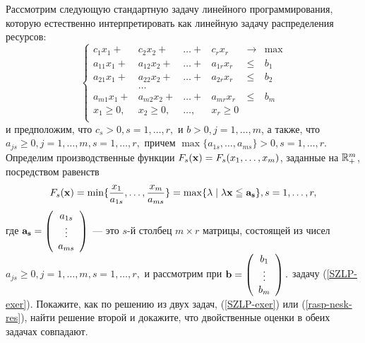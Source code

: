 \begin{exer}
    Рассмотрим следующую стандартную задачу линейного
    программирования, которую
    естественно интерпретировать  как линейную задачу распределения
    ресурсов:
\begin{equation} \label{SZLP-exer}
\left\{
\begin{array}{rrrrllll}
     c_1 x_1 + & c_2 x_2 +    & \ldots +& c_r x_r &\to & \max\\
     a_{11} x_1 + & a_{12} x_2 + &\ldots +& a_{1r} x_r &\leqslant& b_1 \\
     a_{21} x_1 + & a_{22} x_2 + &\ldots +& a_{2r} x_r &\leqslant& b_2\\
                      & \ldots &&&&\\
     a_{m1} x_1 + & a_{m2} x_2 +& \ldots +& a_{mr} x_r &\leqslant& b_m\\
     x_1 \geqslant 0,   & x_2 \geqslant 0,  & \ldots,&  x_r \geqslant 0\\
\end{array} \right.
\end{equation}
    и предположим, что $c_{s}>0, s=1,\ldots,r,$ и $b>0, j=1,\ldots,m$, а
    также, что $a_{js}\geqslant0, j=1,\ldots,m, s=1,\ldots,r,$
    причем $\max\{a_{1s},\ldots,a_{ms}\}>0, s=1,\ldots,r$.
    Определим производственные функции
    $F_{s}(\mathbf{x})=F_{s}(x_{1},\ldots,x_{m})$,
    заданные на $\mathbb{R}_{+}^{m}$, посредством равенств
\[
    F_{s}(\mathbf{x})=\min\{\frac{x_{1}}{a_{1s}},\ldots,\frac{x_{m}}{a_{ms}}\}
    =\max\{\lambda\mid\lambda\mathbf{x}\leqq\mathbf{a_{s}}\},
    s=1,\ldots,r,
\]
    где $\mathbf{a_{s}}=\left(
                      \begin{array}{c}
                        a_{1s} \\
                        \vdots \\
                        a_{ms} \\
                      \end{array}
                    \right)
    $
    --- это $s$-й столбец $m\times r$ матрицы, состоящей из чисел
    $a_{js}\geqslant0, j=1,\ldots,m, s=1,\ldots,r,$
    и рассмотрим при $\mathbf{b}=\left(
                                         \begin{array}{c}
                                           b_{1} \\
                                           \vdots \\
                                           b_{m} \\
                                         \end{array}
                                       \right).    $
    задачу (\ref{SZLP-exer}).
    Покажите, как по решению из двух задач, (\ref{SZLP-exer})
    или (\ref{rasp-nesk-res}), найти
    решение второй и докажите, что двойственные оценки в обеих
    задачах совпадают.
\end{exer}



